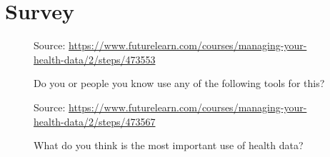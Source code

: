 \documentclass[10pt, twoside]{article}   	%
\begin{document}
\section{Survey}
    \begin{figure}[H]
      \centering
            {\scriptsize%
            Source: \url{https://www.futurelearn.com/courses/managing-your-health-data/2/steps/473553}}
 \caption{Do you or people you know use any of the following tools for this?}
 \end{figure}
    \begin{figure}[H]
      \centering
            {\scriptsize%
            Source: \url{https://www.futurelearn.com/courses/managing-your-health-data/2/steps/473567}}
 \caption{What do you think is the most important use of health data?}
 \end{figure}
\end{document}
